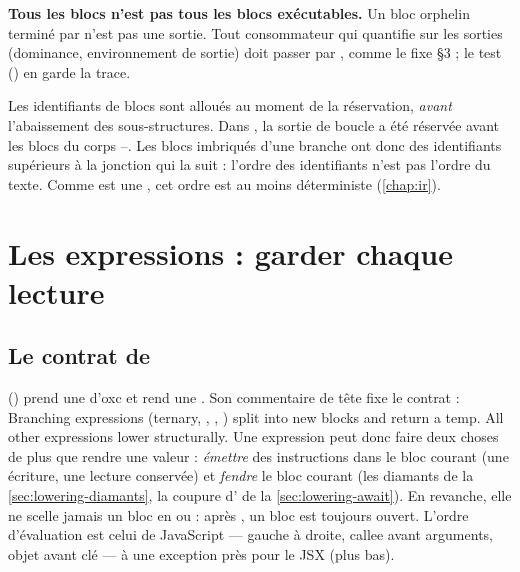 \begin{piege}
\textbf{\og Tous les blocs\fg{} n'est pas \og tous les blocs exécutables\fg{}.} Un bloc orphelin terminé par  n'est pas une sortie. Tout consommateur qui quantifie sur les sorties (dominance, environnement de sortie) doit passer par , comme le fixe  §3 ; le test  () en garde la trace.
\end{piege}

\begin{remarque}
Les identifiants de blocs sont alloués au moment de la réservation, \emph{avant} l'abaissement des sous-structures. Dans , la sortie de boucle  a été réservée avant les blocs du corps --. Les blocs imbriqués d'une branche ont donc des identifiants supérieurs à la jonction qui la suit : l'ordre des identifiants n'est pas l'ordre du texte. Comme  est une , cet ordre est au moins déterministe (\cref{chap:ir}).
\end{remarque}

\section{Les expressions : garder chaque lecture}
\label{sec:lowering-expr}

\subsection{Le contrat de }

 () prend une  d'oxc et rend une . Son commentaire de tête fixe le contrat : \og Branching expressions (ternary, \code{&&}, \code{||}, ) split  into new blocks and return a  temp. All other expressions lower structurally.\fg{} Une expression peut donc faire deux choses de plus que rendre une valeur : \emph{émettre} des instructions dans le bloc courant (une écriture, une lecture conservée) et \emph{fendre} le bloc courant (les diamants de la \cref{sec:lowering-diamants}, la coupure d' de la \cref{sec:lowering-await}). En revanche, elle ne scelle jamais un bloc en  ou  : après , un bloc est toujours ouvert. L'ordre d'évaluation est celui de JavaScript --- gauche à droite, callee avant arguments, objet avant clé --- à une exception près pour le JSX (plus bas).

